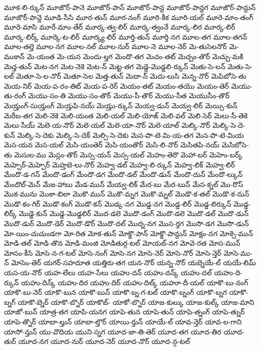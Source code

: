{మూక-లి-ర్కున్
మూజొర్-పానె
మూజొర్-పాన్
మూజొర్-పాన్ద
మూజొర్-పాన్దగ
మూజొర్-పాన్దున్
మూజొర్-పాన్దె
మూడి-సీసి
మూర-తున్
మూర-నంగ్
మూరి-కీక
మూరి-యల్
మూరె-మాం-తంగ్
మూరె-మాసి
మూరే-మాం-తేర్
మూర్క-త్వ-లిర్
మూర్క-త్వంనే
మూర్క-లిర
మూర్క-లిర్
మూర్క-లిర్క్
మూర్కె-ట-లిర్
మూర్క్య-లిర్
మూర్తి-తున్
మూర్తి-నగ
మూల-తగ
మూల-తగన్
మూల-తల్తె
మూల-నగ
మూల-నల్
మూల-నుర్
మూల-నె
మూల-నెర్
మె-తుసెలనొర్
మె-ముకాన్
మె-యంత
మె-యన
మెందు-ల్తగ
మెందొ-తగ
మెచం-తట్
మెచ్చం-తొర్
మెచ్చు-మకి
మెచ్త-తున్
మెట-నగ
మెట-నెకె
మెట-న్
మెట్ట-తగ
మెడ్డె-మొడ్డలి-ర్కున్
మెతు-సె-లన్
మెతు-సె-లల్
మెతూ-సె-ల-నొర్
మెతూ-సెల
మెత్త-తున్
మెదా-న్
మెదు-లుసి
మెన్న-నొర్
మెపిబోసె-తు
మెయ-నిర్
మెయ-ప-రం-తిట్
మెయ-ప-రెర్
మెయం-తట్
మెయం-తయొ
మెయం-తెర్
మెయు-తు-రంగ్
మెయు-సం-తి
మెయు-సం-తొర్
మెయు-సీ-తొర్
మెయు-సీత
మెయుసీం-తొర్
మెయ్తంగ్-సుయ్తంగ్
మెయ్తపి-నయ్
మెయ్తు-ర్కున్
మెయ్వ-డున్
మెయ్వ-లిర్
మెయ్సి-కున్
మెరీబ-తగ
మెలి-నెకె
మెలి-యంత
మెలి-యల్
మెలి-యోఙ్
మెలి-వల్
మెలి-సెర్
మెలు-సీ-తెకె
మెలు-సీయ్
మెలె-య-నొర్
మెలె-యల్
మెలె-యా-నొర్
మెలె-యాల్
మెల్కి-నొర్
మెల్కి-సె-దె-కున్
మెల్కి-సె-దెకు
మెల్కి-సె-దెక్
మెల్సి-సె-దెకు
మెస-పొ-టె-మి-య-తగ
మెస-పొ-టె-మియ
మెస-యన
మెస-యల్
మెసి-యంతెర్
మెసి-యంతొర్
మెసి-లి-నొర్
మెసితపి-నయ్
మెసిబోసె-తు
మెసుల-ము
మెస్లం-తొర్
మెస్స-యన్
మెస్స-యల్
మెహం-తెరొ
మెహా-బర్
మెహెం-బర్క్
మెహ్చెర్-మెహ్చెర్
మెహ్తబె-లు-నొర్
మెహ్వ-డల్
మెహ్వ-లి-ర్కున్
మెహ్వ-లిక్
మెహ్వ-లిర్
మేందొ-డ-గన్
మేందొ-డంగ్
మేందొ-డగ
మేందొ-డల్
మేందొ-డున్
మేందొ-దున్
మేందొ-ల్కున్
మేందొల్-మెన్
మేజ-హాబు
మేడ-మున్
మేయ్వ-లిక్
మేర-బు
మేర-బున్
మేస-క్నల్
మొ-రొస్
మొక-మును
మొకా-బిలా
మొకొ-మున్
మొకొ-మ్నగ
మొకొ-మ్నల్
మొడొ-క-తల్
మొడొ-క-నున్
మొడొ-కం-గిర్
మొడొ-కంగ్
మొడొ-కన్
మొడ్క-నగ
మొడ్డ-నగ
మొడ్డ-లిర్
మొడ్డ-లిర్కున్
మొడ్డ-లిర్క్
మొడ్డె-కున్
మొడ్డె-మొడ్డలిర్
మొద-డలె
మొదొ-డంగ్
మొదొ-డలె
మొదొ-డల్
మొదొ-డున్
మొదొ-డుర్
మొదొ-డెర్
మొదొ-డొర్
మొదొ-దల్
మొద్న-నగ
మొస-ర్తగ
మొసొ-డగ
మొసొ-డున్
మో-యిం-చుచుండగా
మో-రిత
మోక-తున్
మోక్డొ-పాన్
మోక్డొ-పాన్దున్
మోక్షం-నగ
మోక్సె-మున్
మోడి-తల్
మోడి-తొన
మోడి-మంజి
మోడితుర్గ-టల్
మోయబ్-నగ
మోవె-రత
మోస-మున్
మోసం-కీసి
మోసె-న-గ-టల్
మోసె-నంగ్
మోసె-నగ
మోసె-నెర్
మోసె-నొర్
మోసె-న్తెర్
మోసె-ము-న్
మోసెం-తెర్
యగర్-సహదూత
యత్తిరు-తగ
యన-నొర్
యన్న-నొర్
యబ్నెయే-ల్
యయే-లిమ్
యస-య-నొర్
యహ-లేలు
యహ-సేలు
యహు-దన్
యహు-దన్క్
యహు-దల్
యహు-ది-ర్కున్
యహు-దిన్క్
యహు-దిర
యహు-దిర్
యహు-దిల్క్
యహూ-దీ-యల్
యాకొ-బు-నంగ్
యాకొ-బు-నెర్
యాకొ-బున
యాకొ-బున్
యాకొ-బ్న-గ-టల్
యాకొ-బ్నంగ్
యాకొ-బ్నగ
యాకొ-బ్నగ్
యాకొ-బ్నెర్
యాకొ-బ్నొర్
యాకొబ్-
యాకో-బ్నొర్
యాజ-కుల్కు
యాజ-కుల్క్
యాజ-మాని
యాజో-బున్
యాత్ర-తగ
యాపి-యనగ
యాపె-తున
యాపె-తున్
యాపె-త్నంగ్
యాపె-త్నుర్
యాపె-త్నొర్
యాబా-ల్తున్
యాబా-ల్తొర్
యాయి-ర్తున్
యాయే-ల్
యావ-న్తెర్
యావ-ల-గాని
యాసో-న్తున్
యు-వొదియ
యుని-స్నగ
యూద-జా-తి-తెర్
యూద-తగ
యూద-తిర
యూద-తుర్
యూద-నగ
యూద-నుర్
యూద-నెర్
యూద-నొర్
యూద-న్గ-టల్
}
